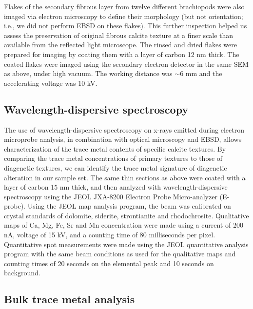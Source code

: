 \documentclass[preprint, authoryear]{elsarticle}
\begin{document}
Flakes of the secondary fibrous layer from twelve different brachiopods were also imaged via electron microscopy to define their morphology (but not orientation; i.e., we did not perform EBSD on these flakes). This further inspection helped us assess the preservation of original fibrous calcite texture at a finer scale than available from the reflected light microscope. The rinsed and dried flakes were prepared for imaging by coating them with a layer of carbon 12 nm thick. The coated flakes were imaged using the secondary electron detector in the same SEM as above, under high vacuum. The working distance was $\sim$6 mm and the accelerating voltage was 10 kV.

\subsection{Wavelength-dispersive spectroscopy}

The use of wavelength-dispersive spectroscopy on x-rays emitted during electron microprobe analysis, in combination with optical microscopy and EBSD, allows characterization of the trace metal contents of specific calcite textures. By comparing the trace metal concentrations of primary textures to those of diagenetic textures, we can identify the trace metal signature of diagenetic alteration in our sample set. The same thin sections as above were coated with a layer of carbon 15 nm thick, and then analyzed with wavelength-dispersive spectroscopy using the JEOL JXA-8200 Electron Probe Micro-analyzer (E-probe). Using the JEOL map analysis program, the beam was calibrated on crystal standards of dolomite, siderite, strontianite and rhodochrosite. Qualitative maps of Ca, Mg, Fe, Sr and Mn concentration were made using a current of 200 nA, voltage of 15 kV, and a counting time of 80 milliseconds per pixel. Quantitative spot measurements were made using the JEOL quantitative analysis program with the same beam conditions as used for the qualitative maps and counting times of 20 seconds on the elemental peak and 10 seconds on background. 

\subsection{Bulk trace metal analysis}
\end{document}
